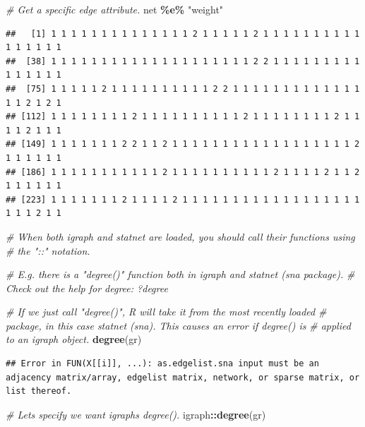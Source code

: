 \documentclass[
]{book}
\newenvironment{Shaded}{\begin{snugshade}}{\end{snugshade}}
\newcommand{\CommentTok}[1]{\textcolor[rgb]{0.56,0.35,0.01}{\textit{#1}}}
\newcommand{\FunctionTok}[1]{\textcolor[rgb]{0.13,0.29,0.53}{\textbf{#1}}}
\newcommand{\NormalTok}[1]{#1}
\newcommand{\SpecialCharTok}[1]{\textcolor[rgb]{0.81,0.36,0.00}{\textbf{#1}}}
\newcommand{\StringTok}[1]{\textcolor[rgb]{0.31,0.60,0.02}{#1}}
\begin{document}
\begin{Shaded}
\begin{Highlighting}[]
\CommentTok{\# Get a specific edge attribute.}
\NormalTok{net }\SpecialCharTok{\%e\%} \StringTok{"weight"}
\end{Highlighting}
\end{Shaded}

\begin{verbatim}
##   [1] 1 1 1 1 1 1 1 1 1 1 1 1 1 1 2 1 1 1 1 1 2 1 1 1 1 1 1 1 1 1 1 1 1 1 1 1 1
##  [38] 1 1 1 1 1 1 1 1 1 1 1 1 1 1 1 1 1 1 1 1 2 2 1 1 1 1 1 1 1 1 1 1 1 1 1 1 1
##  [75] 1 1 1 1 1 2 1 1 1 1 1 1 1 1 1 1 2 2 1 1 1 1 1 1 1 1 1 1 1 1 1 1 1 2 1 2 1
## [112] 1 1 1 1 1 1 1 1 2 1 1 1 1 1 1 1 1 1 1 2 1 1 1 1 1 1 1 1 2 1 1 1 1 2 1 1 1
## [149] 1 1 1 1 1 1 1 2 2 1 1 2 1 1 1 1 1 1 1 1 1 1 1 1 1 1 1 1 1 1 2 1 1 1 1 1 1
## [186] 1 1 1 1 1 1 1 1 1 1 1 2 1 1 1 1 1 1 1 1 1 1 2 1 1 1 1 2 1 1 2 1 1 1 1 1 1
## [223] 1 1 1 1 1 1 1 2 1 1 1 1 2 1 1 1 1 1 1 1 1 1 1 1 1 1 1 1 1 1 1 1 1 1 2 1 1
\end{verbatim}

\begin{Shaded}
\begin{Highlighting}[]
\CommentTok{\# When both igraph and statnet are loaded, you should call their functions using}
\CommentTok{\# the "::" notation.}

\CommentTok{\# E.g. there is a "degree()" function both in igraph and statnet (sna package).}
\CommentTok{\# Check out the help for degree: ?degree}

\CommentTok{\# If we just call "degree()", R will take it from the most recently loaded }
\CommentTok{\# package, in this case statnet (sna). This causes an error if degree() is}
\CommentTok{\# applied to an igraph object.}
\FunctionTok{degree}\NormalTok{(gr)}
\end{Highlighting}
\end{Shaded}

\begin{verbatim}
## Error in FUN(X[[i]], ...): as.edgelist.sna input must be an adjacency matrix/array, edgelist matrix, network, or sparse matrix, or list thereof.
\end{verbatim}

\begin{Shaded}
\begin{Highlighting}[]
\CommentTok{\# Let\textquotesingle{}s specify we want igraph\textquotesingle{}s degree().}
\NormalTok{igraph}\SpecialCharTok{::}\FunctionTok{degree}\NormalTok{(gr)}
\end{Highlighting}
\end{Shaded}
\end{document}
